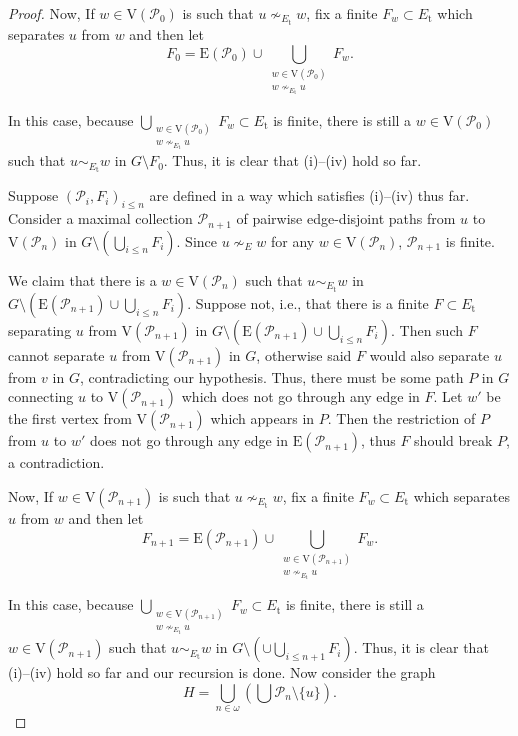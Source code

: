 \documentclass[10pt,a4paper]{amsart}
\begin{document}
\begin{proof}
    Now, If $w\in \mathrm{V}(\mathcal P_0)$ is such that $u\nsim_{E_\mathrm{t}}w$, fix a finite $F_w\subset E_\mathrm{t}$ which separates $u$ from $w$ and then let
    \[
      F_0 = \mathrm{E}(\mathcal P_0)\cup \bigcup_{\substack{w\in \mathrm{V}(\mathcal P_0)\\w\nsim_{E_\mathrm{t}}u}}F_w.
    \]

    
    In this case, because $\bigcup_{\substack{w\in \mathrm{V}(\mathcal P_0)\\w\nsim_{E_\mathrm{t}}u}}F_w\subset E_\mathrm{t}$ is finite, there is still a $w\in \mathrm{V}(\mathcal P_0)$ such that $u\sim_{E_\mathrm{t}} w$ in $G\setminus F_0$. Thus, it is clear that (i)--(iv) hold so far.

    Suppose $(\mathcal P_i,F_i)_{i\le n}$  are defined in a way which satisfies (i)--(iv) thus far. Consider a maximal collection $\mathcal P_{n+1}$ of pairwise edge-disjoint paths from $u$ to $\mathrm{V}(\mathcal P_n)$ in $G\setminus \left(\bigcup_{i\le n}F_i\right)$. Since $u\nsim_E w$ for any $w\in \mathrm{V}(\mathcal P_n)$, $\mathcal P_{n+1}$ is finite. 

    
    We claim that there is a $w\in \mathrm{V}(\mathcal P_n)$ such that $u\sim_{E_\mathrm{t}} w$ in $G\setminus \left(\mathrm{E}(\mathcal P_{n+1})\cup\bigcup_{i\le n}F_i\right)$. Suppose not, i.e., that there is a finite $F\subset E_\mathrm{t}$ separating $u$ from $\mathrm{V}(\mathcal P_{n+1})$ in $G\setminus \left(\mathrm{E}(\mathcal P_{n+1})\cup\bigcup_{i\le n}F_i\right)$. Then such $F$ cannot separate $u$ from $\mathrm{V}(\mathcal P_{n+1})$ in $G$, otherwise said $F$ would also separate $u$ from $v$ in $G$, contradicting our hypothesis. Thus, there must be some path $P$ in $G$ connecting $u$ to $\mathrm{V}(\mathcal P_{n+1})$ which does not go through any edge in $F$. Let $w'$ be the first vertex from $\mathrm{V}(\mathcal P_{n+1})$ which appears in $P$. Then the restriction of $P$ from $u$ to $w'$ does not go through any edge in $\mathrm{E}(\mathcal P_{n+1})$, thus $F$ should break $P$, a contradiction. 
    
    Now, If $w\in \mathrm{V}(\mathcal P_{n+1})$ is such that $u\nsim_{E_\mathrm{t}}w$, fix a finite $F_w\subset E_\mathrm{t}$ which separates $u$ from $w$ and then let
    \[
      F_{n+1} = \mathrm{E}(\mathcal P_{n+1})\cup \bigcup_{\substack{w\in \mathrm{V}(\mathcal P_{n+1})\\w\nsim_{E_\mathrm{t}}u}}F_w.
    \]

    In this case, because $\bigcup_{\substack{w\in \mathrm{V}(\mathcal P_{n+1})\\w\nsim_{E_\mathrm{t}}u}}F_w\subset E_\mathrm{t}$ is finite, there is still a $w\in \mathrm{V}(\mathcal P_{n+1})$ such that $u\sim_{E_\mathrm{t}} w$ in $G\setminus \left(\cup\bigcup_{i\le n+1}F_i\right)$. Thus, it is clear that (i)--(iv) hold so far and our recursion is done. Now consider the graph 
    \[
        H = \bigcup_{n\in\omega}\left(\bigcup\mathcal P_n\setminus \{u\}\right).
    \]
    

\end{proof}
\end{document}
